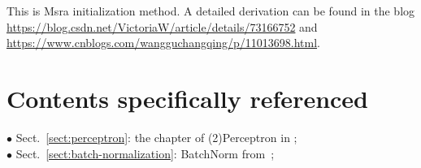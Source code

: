 \documentclass[10pt,onecolumn]{book}
\begin{document}
This is Msra initialization method. A detailed derivation can be found in the blog \url{https://blog.csdn.net/VictoriaW/article/details/73166752} and \url{https://www.cnblogs.com/wangguchangqing/p/11013698.html}. 

\chapter{Contents specifically referenced}
\noindent $\bullet$ Sect.~\ref{sect:perceptron}: the chapter of (2)Perceptron in \cite{hangli2012}; \\
$\bullet$ Sect.~\ref{sect:batch-normalization}: BatchNorm from~\cite{ioffe2015batch};

{\small


}
\end{document}
